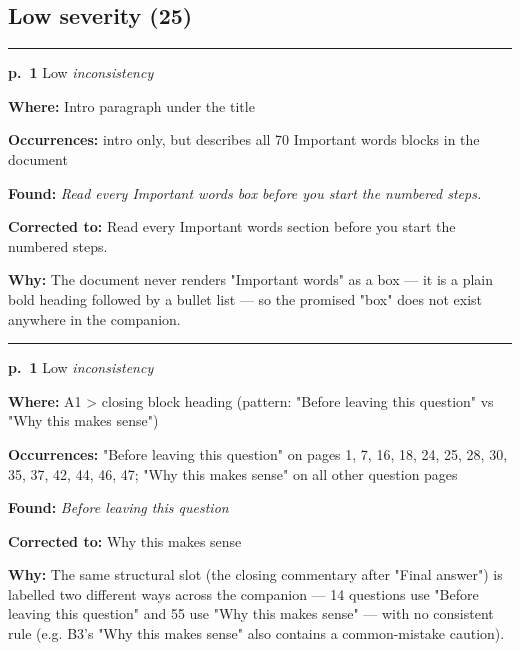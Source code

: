 \documentclass[11pt]{article}
\newcommand{\sevlow}[1]{\textcolor{black!55}{#1}}
\begin{document}
\subsection*{Low severity (25)}
\noindent\rule{\textwidth}{0.4pt}\par\nobreak\vspace{2pt}
\noindent\textbf{p.~1} \quad \sevlow{Low} \quad \textit{inconsistency}\par
\noindent\textbf{Where: }Intro paragraph under the title\par
\noindent\textbf{Occurrences: }intro only, but describes all 70 Important words blocks in the document\par
\noindent\textbf{Found: }\textit{Read every Important words box before you start the numbered steps.}\par
\noindent\textbf{Corrected to: }Read every Important words section before you start the numbered steps.\par
\noindent\textbf{Why: }The document never renders "Important words" as a box --- it is a plain bold heading followed by a bullet list --- so the promised "box" does not exist anywhere in the companion.\par\vspace{4pt}
\noindent\rule{\textwidth}{0.4pt}\par\nobreak\vspace{2pt}
\noindent\textbf{p.~1} \quad \sevlow{Low} \quad \textit{inconsistency}\par
\noindent\textbf{Where: }A1 > closing block heading (pattern: "Before leaving this question" vs "Why this makes sense")\par
\noindent\textbf{Occurrences: }"Before leaving this question" on pages 1, 7, 16, 18, 24, 25, 28, 30, 35, 37, 42, 44, 46, 47; "Why this makes sense" on all other question pages\par
\noindent\textbf{Found: }\textit{Before leaving this question}\par
\noindent\textbf{Corrected to: }Why this makes sense\par
\noindent\textbf{Why: }The same structural slot (the closing commentary after "Final answer") is labelled two different ways across the companion --- 14 questions use "Before leaving this question" and 55 use "Why this makes sense" --- with no consistent rule (e.g. B3's "Why this makes sense" also contains a common-mistake caution).\par\vspace{4pt}
\end{document}
